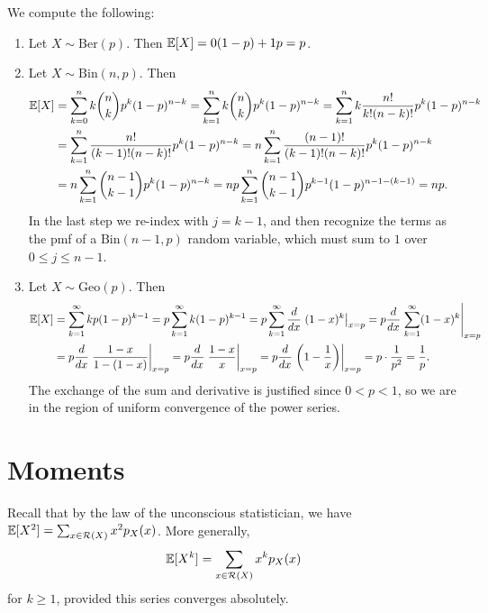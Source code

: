 \begin{example} We compute the following:
  \begin{enumerate}
    \item Let $X \sim \mathrm{Ber}(p)$. Then
      $\mathbb{E}[X] = 0(1 - p) + 1p = p$.
    \item Let $X \sim \mathrm{Bin}(n, p)$. Then
      \begin{align*}
        \mathbb{E}[X]
        &= \sum_{k = 0}^n k \binom{n}{k} p^k (1 - p)^{n - k}
        = \sum_{k = 1}^n k \binom{n}{k} p^k (1 - p)^{n - k}
        = \sum_{k = 1}^n k \frac{n!}{k!(n - k)!} p^k (1 - p)^{n - k} \\
        &= \sum_{k = 1}^n \frac{n!}{(k - 1)!(n - k)!} p^k (1 - p)^{n - k}
        = n \sum_{k = 1}^n \frac{(n - 1)!}{(k - 1)!(n - k)!} p^k (1 - p)^{n - k} \\
        &= n \sum_{k = 1}^n \binom{n - 1}{k - 1} p^k (1 - p)^{n - k}
        = np \sum_{k = 1}^n \binom{n - 1}{k - 1} p^{k - 1} (1 - p)^{n - 1 - (k - 1)} = np.
      \end{align*}
      In the last step we re-index with $j = k - 1$,
      and then recognize the terms as the pmf
      of a $\mathrm{Bin}(n - 1, p)$ random variable,
      which must sum to $1$ over $0 \le j \le n - 1$.
    \item Let $X \sim \mathrm{Geo}(p)$. Then
      \begin{align*}
        \mathbb{E}[X]
        &= \sum_{k = 1}^\infty k p(1 - p)^{k - 1}
        = p \sum_{k = 1}^\infty k(1 - p)^{k - 1}
        = p \sum_{k = 1}^\infty \frac{d}{dx}\left. (1 - x)^k\right|_{x = p}
        = p \frac{d}{dx} \left.\sum_{k = 1}^\infty (1 - x)^k\right|_{x = p} \\
        &= p \frac{d}{dx} \left.\frac{1 - x}{1 - (1 - x)}\right|_{x = p}
        = p \frac{d}{dx} \left.\frac{1 - x}{x}\right|_{x = p}
        = p \frac{d}{dx} \left.\left(1 - \frac{1}{x}\right)\right|_{x = p}
        = p \cdot \frac{1}{p^2} = \frac{1}{p}.
      \end{align*}
      The exchange of the sum and derivative is
      justified since $0 < p < 1$, so we are in the
      region of uniform convergence of the power
      series.
  \end{enumerate}
\end{example}

\section{Moments}
Recall that by the law of the unconscious statistician,
we have $\mathbb{E}[X^2] = \sum_{x \in \mathcal{R}(X)} x^2 p_X(x)$.
More generally,
\[
  \mathbb{E}[X^k] = \sum_{x \in \mathcal{R}(X)} x^k p_X(x)
\]
for $k \ge 1$, provided this series converges
absolutely.

